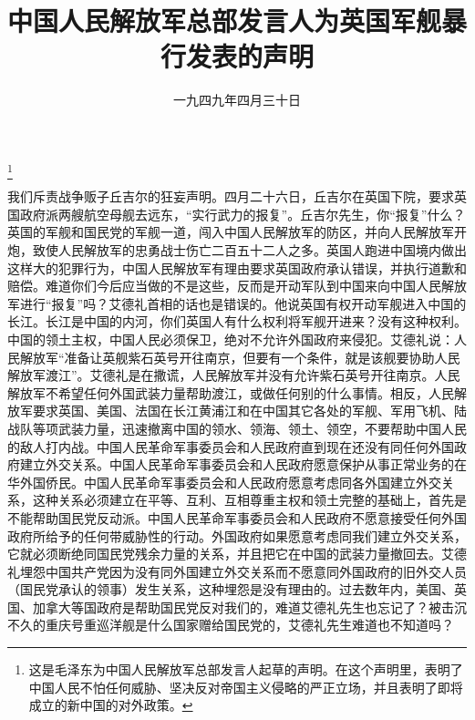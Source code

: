 
\title{中国人民解放军总部发言人为英国军舰暴行发表的声明}
\date{一九四九年四月三十日}
\thanks{这是毛泽东为中国人民解放军总部发言人起草的声明。在这个声明里，表明了中国人民不怕任何威胁、坚决反对帝国主义侵略的严正立场，并且表明了即将成立的新中国的对外政策。}
\maketitle


我们斥责战争贩子丘吉尔的狂妄声明。四月二十六日，丘吉尔在英国下院，要求英国政府派两艘航空母舰去远东，“实行武力的报复”。丘吉尔先生，你“报复”什么？英国的军舰和国民党的军舰一道，闯入中国人民解放军的防区，并向人民解放军开炮，致使人民解放军的忠勇战士伤亡二百五十二人之多。英国人跑进中国境内做出这样大的犯罪行为，中国人民解放军有理由要求英国政府承认错误，并执行道歉和赔偿。难道你们今后应当做的不是这些，反而是开动军队到中国来向中国人民解放军进行“报复”吗？艾德礼首相的话也是错误的。他说英国有权开动军舰进入中国的长江。长江是中国的内河，你们英国人有什么权利将军舰开进来？没有这种权利。中国的领土主权，中国人民必须保卫，绝对不允许外国政府来侵犯。艾德礼说：人民解放军“准备让英舰紫石英号开往南京，但要有一个条件，就是该舰要协助人民解放军渡江”。艾德礼是在撒谎，人民解放军并没有允许紫石英号开往南京。人民解放军不希望任何外国武装力量帮助渡江，或做任何别的什么事情。相反，人民解放军要求英国、美国、法国在长江黄浦江和在中国其它各处的军舰、军用飞机、陆战队等项武装力量，迅速撤离中国的领水、领海、领土、领空，不要帮助中国人民的敌人打内战。中国人民革命军事委员会和人民政府直到现在还没有同任何外国政府建立外交关系。中国人民革命军事委员会和人民政府愿意保护从事正常业务的在华外国侨民。中国人民革命军事委员会和人民政府愿意考虑同各外国建立外交关系，这种关系必须建立在平等、互利、互相尊重主权和领土完整的基础上，首先是不能帮助国民党反动派。中国人民革命军事委员会和人民政府不愿意接受任何外国政府所给予的任何带威胁性的行动。外国政府如果愿意考虑同我们建立外交关系，它就必须断绝同国民党残余力量的关系，并且把它在中国的武装力量撤回去。艾德礼埋怨中国共产党因为没有同外国建立外交关系而不愿意同外国政府的旧外交人员（国民党承认的领事）发生关系，这种埋怨是没有理由的。过去数年内，美国、英国、加拿大等国政府是帮助国民党反对我们的，难道艾德礼先生也忘记了？被击沉不久的重庆号重巡洋舰是什么国家赠给国民党的，艾德礼先生难道也不知道吗？


